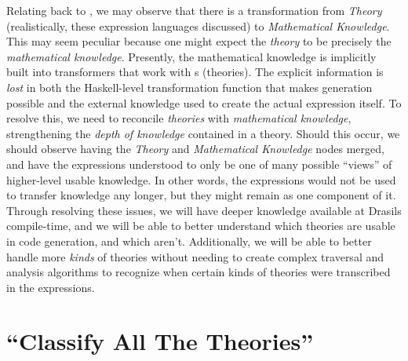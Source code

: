Relating back to , we may observe that there is a
transformation from \textit{Theory} (realistically, these expression languages
discussed) to \textit{Mathematical Knowledge}. This may seem peculiar because
one might expect the \textit{theory} to be precisely the \textit{mathematical
	knowledge}. Presently, the mathematical knowledge is implicitly built into
transformers that work with \RelationConcept{}s (theories). The explicit
information is \textit{lost} in both the Haskell-level transformation function
that makes generation possible and the external knowledge used to create the
actual expression itself. To resolve this, we need to reconcile
\textit{theories} with \textit{mathematical knowledge}, strengthening the
\textit{depth of knowledge} contained in a theory. Should this occur, we should
observe  having the \textit{Theory} and
\textit{Mathematical Knowledge} nodes merged, and have the expressions
understood to only be one of many possible ``views'' of higher-level usable
knowledge. In other words, the expressions would not be used to transfer
knowledge any longer, but they might remain as one component of it. Through
resolving these issues, we will have deeper knowledge available at Drasils
compile-time, and we will be able to better understand which theories are usable
in code generation, and which aren't. Additionally, we will be able to better
handle more \textit{kinds} of theories without needing to create complex
traversal and analysis algorithms to recognize when certain kinds of theories
were transcribed in the expressions.

\section{``Classify All The Theories''}

